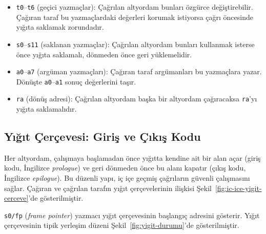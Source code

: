 \begin{itemize}[nosep]
\item \texttt{t0}--\texttt{t6} (geçici yazmaçlar): Çağrılan altyordam bunları özgürce değiştirebilir. Çağıran taraf bu yazmaçlardaki değerleri korumak istiyorsa çağrı öncesinde yığıta saklamak zorundadır.
\item \texttt{s0}--\texttt{s11} (saklanan yazmaçlar): Çağrılan altyordam bunları kullanmak isterse önce yığıta saklamalı, dönmeden önce geri yüklemelidir.
\item \texttt{a0}--\texttt{a7} (argüman yazmaçları): Çağıran taraf argümanları bu yazmaçlara yazar. Dönüşte \texttt{a0}--\texttt{a1} sonuç değerlerini taşır.
\item \texttt{ra} (dönüş adresi): Çağrılan altyordam başka bir altyordam çağıracaksa \texttt{ra}'yı yığıta saklamalıdır.
\end{itemize}

\subsection{Yığıt Çerçevesi: Giriş ve Çıkış Kodu}
\label{sec:yigit-cercevesi}

Her altyordam, çalışmaya başlamadan önce yığıtta kendine ait bir alan açar (giriş kodu, İngilizce \emph{prologue}) ve geri dönmeden önce bu alanı kapatır (çıkış kodu, İngilizce \emph{epilogue}). Bu düzenli yapı, iç içe geçmiş çağrıların güvenli çalışmasını sağlar. Çağıran ve çağrılan tarafın yığıt çerçevelerinin ilişkisi Şekil~\ref{fig:ic-ice-yigit-cerceve}'de gösterilmiştir.

\texttt{s0/fp} (\emph{frame pointer}) yazmacı yığıt çerçevesinin başlangıç adresini gösterir. Yığıt çerçevesinin tipik yerleşim düzeni Şekil~\ref{fig:yigit-durumu}'de gösterilmiştir.

